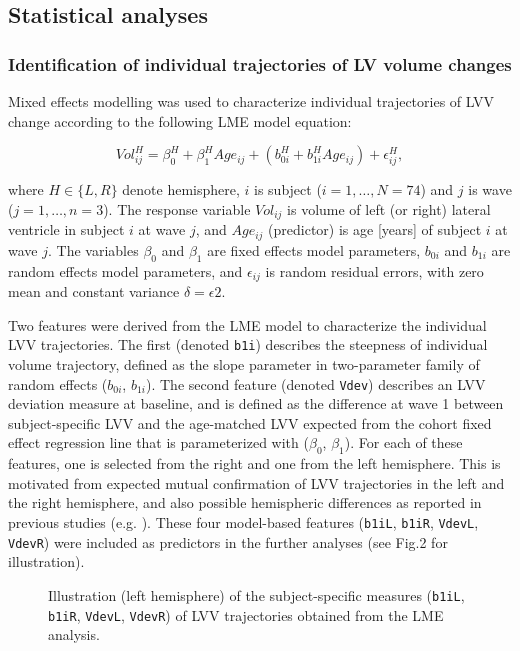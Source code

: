 \documentclass[10pt,letterpaper]{article}
\begin{document}
\subsection{Statistical analyses}

\subsubsection{Identification of individual trajectories of LV volume changes} 

Mixed effects modelling was used to characterize individual trajectories of LVV change according to the following LME model equation: 

$$Vol_{ij}^H = \beta_0^H + \beta_1^H Age_{ij} + (b_{0i}^H + b_{1i}^H Age_{ij}) + \epsilon_{ij}^H,$$ 

where $H \in \{L, R\}$ denote hemisphere, $i$ is subject ($i = 1, \ldots,N = 74$)  and $j$ is wave ($j= 1,\ldots,n=3$). The response variable
$Vol_{ij}$ is volume of left (or right) lateral ventricle in subject $i$ at wave $j$, 
and $Age_{ij}$ (predictor) is age [years] of subject $i$ at wave $j$. 
The variables $\beta_0$ and $\beta_1$ are fixed effects model parameters, $b_{0i}$  and  $b_{1i}$ are random effects model parameters, and $\epsilon_{ij}$ is random residual errors,  with zero mean and constant variance $\delta = \epsilon 2$. 

\vspace{5mm}
Two features were derived from the LME model to characterize the individual LVV trajectories. 
The first (denoted {\tt b1i}) describes the steepness of individual volume trajectory, defined as the slope parameter in two-parameter family of random effects ($b_{0i}$, $b_{1i}$). 
The second feature (denoted {\tt Vdev}) describes an LVV deviation measure at baseline, and is defined as the difference at wave 1 between subject-specific LVV and the age-matched LVV expected from the cohort fixed effect regression line that is parameterized with ($\beta_0$, $\beta_1$).
For each of these features, one is selected from the right and one from the left hemisphere. 
This is motivated from expected mutual confirmation of LVV trajectories in the left and the right hemisphere, and also possible hemispheric differences as reported in previous studies (e.g. \cite{Trimarchi2013}). These four model-based features ({\tt b1iL}, {\tt b1iR}, {\tt VdevL}, {\tt VdevR}) were included as predictors in the further analyses (see Fig.2 for illustration). \\

\vspace{3mm}
\begin{figure}[H]
\caption{
Illustration (left hemisphere) of the subject-specific measures ({\tt b1iL}, {\tt b1iR}, {\tt VdevL}, {\tt VdevR}) of LVV trajectories obtained from the LME analysis. \\}
\label{fig 2}
\end{figure}
\vspace{3mm}
\end{document}
